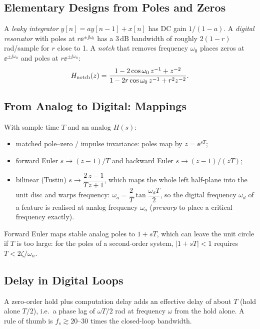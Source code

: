 \documentclass[11pt,a4paper]{article}
\begin{document}
\subsection{Elementary Designs from Poles and Zeros}
A \emph{leaky integrator} $y[n]=ay[n-1]+x[n]$ has DC gain $1/(1-a)$. A \emph{digital resonator} with poles at $r\ee^{\pm\jj\omega_0}$ has a $3\,\mathrm{dB}$ bandwidth of roughly $2(1-r)$ rad/sample for $r$ close to 1. A \emph{notch} that removes frequency $\omega_0$ places zeros at $\ee^{\pm\jj\omega_0}$ and poles at $r\ee^{\pm\jj\omega_0}$:
\begin{equation}
  H_{\rm notch}(z)=\frac{1-2\cos\omega_0\,z^{-1}+z^{-2}}{1-2r\cos\omega_0\,z^{-1}+r^2z^{-2}}.
  \label{eq:notch}
\end{equation}

\subsection{From Analog to Digital: Mappings}
With sample time $T$ and an analog $H(s)$:
\begin{itemize}
  \item matched pole--zero / impulse invariance: poles map by $z=\ee^{sT}$;
  \item forward Euler $s\to(z-1)/T$ and backward Euler $s\to(z-1)/(zT)$;
  \item bilinear (Tustin) $s\to\dfrac2T\dfrac{z-1}{z+1}$, which maps the whole left half-plane into the unit disc and warps frequency: $\omega_a=\dfrac2T\tan\dfrac{\omega_dT}{2}$, so the digital frequency $\omega_d$ of a feature is realised at analog frequency $\omega_a$ (\emph{prewarp} to place a critical frequency exactly).
\end{itemize}
Forward Euler maps stable analog poles to $1+sT$, which can leave the unit circle if $T$ is too large: for the poles of a second-order system, $|1+sT|<1$ requires $T<2\zeta/\omega_n$.

\subsection{Delay in Digital Loops}
A zero-order hold plus computation delay adds an effective delay of about $T$ (hold alone $T/2$), i.e.\ a phase lag of $\omega T/2$ rad at frequency $\omega$ from the hold alone. A rule of thumb is $f_s\gtrsim20$--$30$ times the closed-loop bandwidth.
\end{document}
